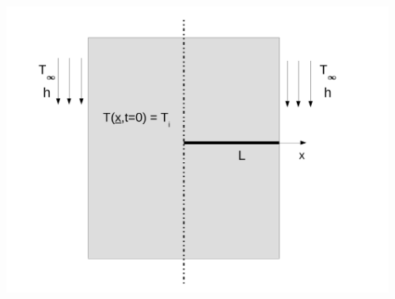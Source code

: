 \documentclass[10pt,compress]{beamer}
\begin{document}
\begin{frame}
\begin{columns}
\begin{column}[l]{0.6\linewidth}
    \end{column}
     \begin{column}[l]{0.4\linewidth}
        \begin{center}
          \includegraphics[width=1.1\columnwidth,height=1.3\columnwidth,clip]{./Pics/HT_PlaneWall}
        \end{center}
    \end{column}
  \end{columns}
\end{frame}
\end{document}
